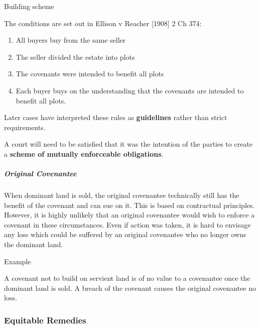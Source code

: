 \documentclass[
]{article}
\providecommand{\tightlist}{%
  \setlength{\itemsep}{0pt}\setlength{\parskip}{0pt}}
\newenvironment{env-9a1d7316-f242-42ab-b216-19df5e12c935}
{
    \savenotes\tcolorbox[blanker,breakable,left=5pt,borderline west={2pt}{-4pt}{pink}]
}
{
    \endtcolorbox\spewnotes
}
\newenvironment{env-de3101d4-f08b-48eb-bc0e-2fa06f3bcf8e}
{
    \savenotes\tcolorbox[blanker,breakable,left=5pt,borderline west={2pt}{-4pt}{purple}]
}
{
    \endtcolorbox\spewnotes
}
\begin{document}
\begin{env-9a1d7316-f242-42ab-b216-19df5e12c935}

Building scheme

The conditions are set out in Ellison v Reacher {[}1908{]} 2 Ch 374:

\begin{enumerate}
\tightlist
\item
  All buyers buy from the same seller
\item
  The seller divided the estate into plots
\item
  The covenants were intended to benefit all plots
\item
  Each buyer buys on the understanding that the covenants are intended
  to benefit all plots.
\end{enumerate}

Later cases have interpreted these rules as \textbf{guidelines} rather
than strict requirements.

A court will need to be satisfied that it was the intention of the
parties to create a \textbf{scheme of mutually enforceable obligations}.

\end{env-9a1d7316-f242-42ab-b216-19df5e12c935}

\hypertarget{original-covenantee}{%
\subparagraph{Original Covenantee}\label{original-covenantee}}

When dominant land is sold, the original covenantee technically still
has the benefit of the covenant and can sue on it. This is based on
contractual principles. However, it is highly unlikely that an original
covenantee would wish to enforce a covenant in these circumstances. Even
if action was taken, it is hard to envisage any loss which could be
suffered by an original covenantee who no longer owns the dominant land.

\begin{env-de3101d4-f08b-48eb-bc0e-2fa06f3bcf8e}

Example

A covenant not to build on servient land is of no value to a covenantee
once the dominant land is sold. A breach of the covenant causes the
original covenantee no loss.

\end{env-de3101d4-f08b-48eb-bc0e-2fa06f3bcf8e}

\hypertarget{equitable-remedies}{%
\subsubsection{Equitable Remedies}\label{equitable-remedies}}
\end{document}
